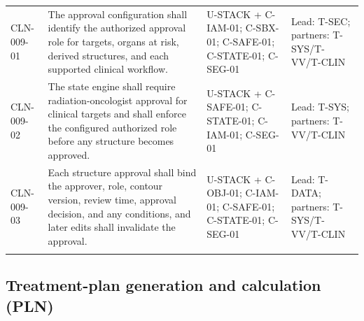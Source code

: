 \documentclass[11pt,letterpaper]{article}
\begin{document}
\begin{scriptsize}
\begin{longtable}{@{}L{0.115\textwidth}L{0.345\textwidth}L{0.265\textwidth}L{0.195\textwidth}@{}}
\mbox{CLN-009-01} & The approval configuration shall identify the authorized approval role for targets, organs at risk, derived structures, and each supported clinical workflow. & U-STACK + C-IAM-01; C-SBX-01; C-SAFE-01; C-STATE-01; C-SEG-01 & Lead: T-SEC; partners: T-SYS\slash\allowbreak{}T-VV\slash\allowbreak{}T-CLIN \\
\addlinespace[2pt]
\mbox{CLN-009-02} & The state engine shall require radiation-oncologist approval for clinical targets and shall enforce the configured authorized role before any structure becomes approved. & U-STACK + C-SAFE-01; C-STATE-01; C-IAM-01; C-SEG-01 & Lead: T-SYS; partners: T-VV\slash\allowbreak{}T-CLIN \\
\addlinespace[2pt]
\mbox{CLN-009-03} & Each structure approval shall bind the approver, role, contour version, review time, approval decision, and any conditions, and later edits shall invalidate the approval. & U-STACK + C-OBJ-01; C-IAM-01; C-SAFE-01; C-STATE-01; C-SEG-01 & Lead: T-DATA; partners: T-SYS\slash\allowbreak{}T-VV\slash\allowbreak{}T-CLIN \\
\addlinespace[2pt]
\end{longtable}
\end{scriptsize}

\subsection{Treatment-plan generation and calculation (PLN)}
\end{document}
